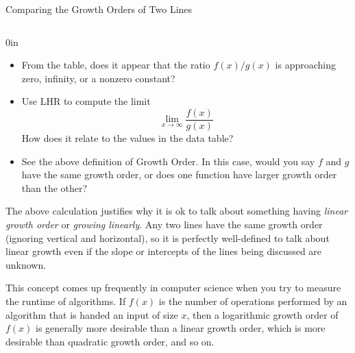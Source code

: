 \begin{exercise}{Comparing the Growth Orders of Two Lines \Coffeecup \Coffeecup}
{\begin{center}
\begin{tabular}{|c||c|c|c|c|c|}
& & & & & \\ \hline
\end{tabular}
\end{center}}{0in}
\begin{itemize}
\item From the table, does it appear that the ratio $f(x)/g(x)$ is approaching zero, infinity, or a nonzero constant?
\item Use LHR to compute the limit $$\lim_{x\rightarrow \infty}\frac{f(x)}{g(x)} $$
How does it relate to the values in the data table? 
\item See the above definition of Growth Order.  In this case, would you say $f$ and $g$ have the same growth order, or does one function have larger growth order than the other?
\end{itemize}
\end{exercise}

The above calculation justifies why it is ok to talk about something having \emph{linear growth order} or \emph{growing linearly}.  Any two lines have the same growth order (ignoring vertical and horizontal), so it is perfectly well-defined to talk about linear growth even if the slope or intercepts of the lines being discussed are unknown.  

This concept comes up frequently in computer science when you try to measure the runtime of algorithms.  If $f(x)$ is the number of operations performed by an algorithm that is handed an input of size $x$, then a logarithmic growth order of $f(x)$ is generally more desirable than a linear growth order, which is more desirable than quadratic growth order, and so on.

